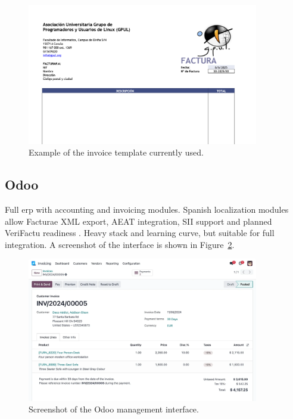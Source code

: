 \begin{figure}[h!]
  \centering
  \includegraphics[width=0.9\textwidth]{imaxes/invoice.png}
  \caption{Example of the invoice template currently used.}
  \label{fig:invoice-template}
\end{figure}

\subsection*{Odoo}
Full \gls{erp} with accounting and invoicing modules. Spanish localization modules allow Facturae XML export, AEAT integration, SII support and planned VeriFactu readiness \cite{odoo-einvoice-spain}. Heavy stack and learning curve, but suitable for full integration. A screenshot of the interface is shown in Figure~\ref{fig:odoo-ui}.

\begin{figure}[h!]
  \centering
  \includegraphics[width=0.9\textwidth]{imaxes/odoo-ui.png}
  \caption{Screenshot of the Odoo management interface.}
  \label{fig:odoo-ui}
\end{figure}

